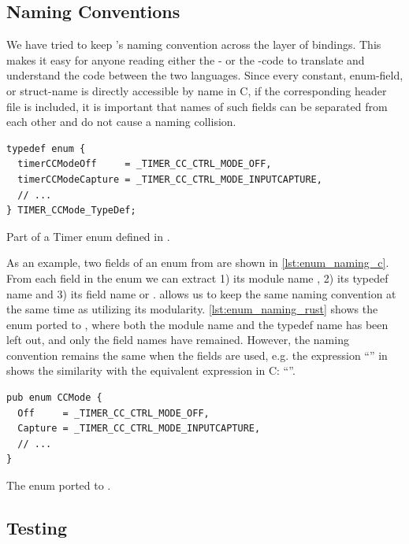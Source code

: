 \subsection{Naming Conventions}

We have tried to keep \emlib's naming convention across the layer of bindings.
This makes it easy for anyone reading either the {\C}- or the {\rust}-code to translate and understand the code between the two languages.
Since every constant, enum-field, or struct-name is directly accessible by name in C, if the corresponding header file is included, it is important that names of such fields can be separated from each other and do not cause a naming collision.

\begin{listing}[h]
\begin{verbatim}
typedef enum {
  timerCCModeOff     = _TIMER_CC_CTRL_MODE_OFF,
  timerCCModeCapture = _TIMER_CC_CTRL_MODE_INPUTCAPTURE,
  // ...
} TIMER_CCMode_TypeDef;
\end{verbatim}
\caption{Part of a Timer enum defined in {\C}.}
\label{lst:enum_naming_c}
\end{listing}

As an example, two fields of an enum from  are shown in \autoref{lst:enum_naming_c}.
From each field in the enum we can extract 1) its module name , 2) its typedef name  and 3) its field name  or .
{\rust} allows us to keep the same naming convention at the same time as utilizing its modularity.
\autoref{lst:enum_naming_rust} shows the enum ported to {\rust}, where both the module name and the typedef name has been left out, and only the field names have remained.
However, the naming convention remains the same when the fields are used, e.g. the expression ``'' in {\rust} shows the similarity with the equivalent expression in C: ``''.

\begin{listing}[h]
\begin{verbatim}
pub enum CCMode {
  Off     = _TIMER_CC_CTRL_MODE_OFF,
  Capture = _TIMER_CC_CTRL_MODE_INPUTCAPTURE,
  // ...
}
\end{verbatim}
\caption{The enum ported to {\rust}.}
\label{lst:enum_naming_rust}
\end{listing}

\subsection{Testing}
\label{ssub:testing}

